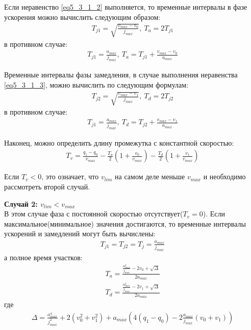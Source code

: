 	Если неравенство \ref{eq5_3_1_2} выполняется, то временные интервалы в фазе ускорения можно вычислить следующим образом:
	\begin{align}
		T_{j1} = \sqrt{\frac{v_{max} - v_{0}}{j_{max}}},\ T_{a} = 2T_{j1}
	\end{align}
	в противном случае:
	\begin{align}
		T_{j1} = \frac{a_{max}}{j_{max}},\ T_{a} = T_{j1} + \frac{v_{max} - v_{0}}{a_{max}}
	\end{align}

	Временные интервалы фазы замедления, в случае выполнения неравенства \ref{eq5_3_1_3}, можно вычислить по следующим формулам:
	\begin{align}
		T_{j2} = \sqrt{\frac{v_{max} - v_{1}}{j_{max}}},\ T_{d} = 2T_{j2}
	\end{align}
	в противном случае:
	\begin{align}
		T_{j1} = \frac{a_{max}}{j_{max}},\ T_{d} = T_{j2} + \frac{v_{max} - v_{1}}{a_{max}}
	\end{align}

	Наконец, можно определить длину промежутка с константной скоростью:
	\begin{align}
		T_{v} = \frac{q_{1} - q_{0}}{v_{max}} - \frac{T_{a}}{2}(1 + \frac{v_{0}}{v_{max}}) - \frac{T_{d}}{2}(1 + \frac{v_{1}}{v_{max}})
	\end{align}

	Если $T_{v} < 0$, это означает, что $v_{lim}$ на самом деле меньше $v_{max}$ и необходимо рассмотреть второй случай.
	
	\textbf{Случай 2: $v_{lim} < v_{max}$}\\
	В этом случае фаза с постоянной скоростью отсутствует($T_{v} = 0$). Если максимальное(минимальное) значения достигаются, то временные интервалы ускорений и замедлений могут быть вычислены:
	\begin{align} \label{eq5_3_1_4}
	T_{j1} = T_{j2} = T_{j} = \frac{a_{max}}{j_{max}}
	\end{align}
	а полное время участков:
	\begin{align} \label{eq5_3_1_5}
		T_{a} = \frac{\frac{a^{2}_{max}}{j_{max}} - 2v_{0} +\sqrt{\Delta}}{2a_{max}}
	\end{align}
	\begin{align} \label{eq5_3_1_6}
		T_{d} = \frac{\frac{a^{2}_{max}}{j_{max}} - 2v_{1} +\sqrt{\Delta}}{2a_{max}}
	\end{align}
	где
	\begin{align} \label{eq5_3_1_7}
		\Delta = \frac{a^{4}_{max}}{j_{max}^{2}} + 2(v_{0}^{2} + v_{1}^{2}) + a_{max}\left( 4(q_{1} - q_{0}) - 2\frac{a_{max}}{j_{max}}(v_{0}+v_{1}) \right)
	\end{align}

